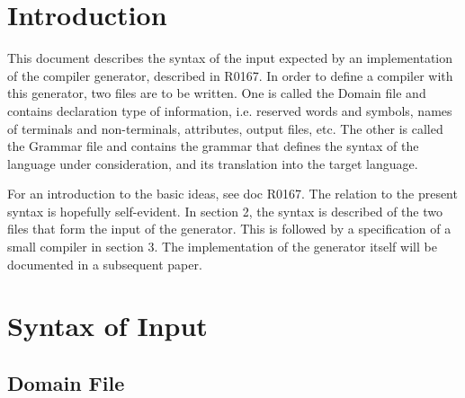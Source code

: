    
      \RosSupersedes{-}
      \MakeRosTitle
\section{Introduction}
This document describes the syntax of the input expected by an implementation
of the compiler generator, described in R0167.
In order to define a compiler with this generator, two files are to be
written. One is called the Domain file and contains declaration type of
information, i.e. reserved words and symbols, names of terminals and
non-terminals, attributes, output files, etc.
The other is called the Grammar file and contains the grammar that defines the
syntax of the language under consideration, and its translation into the
target language.

For an introduction to the basic ideas, see doc R0167. The relation to the
present syntax is hopefully self-evident.
In section 2, the syntax is described of the two files that form the
input of the generator. This is followed by a specification of a small compiler
in section 3. The implementation of the generator itself will be documented in
a subsequent paper.

\section{Syntax of Input}
\subsection{Domain File}
